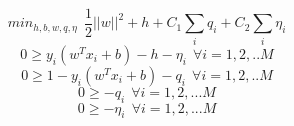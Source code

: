 \begin{equation}\label{mcmeq1}
min_{h,b,w,q,\eta}\:\: \frac{1}{2}||w||^2 + h + C_1\sum_i{q_i} + C_2\sum_i{\eta_i}
\end{equation}
\begin{equation}\label{mcmeq2}
0 \geq y_i(w^Tx_i+b) - h - \eta_i \:\:\forall i={1, 2, .. M}
\end{equation}
\begin{equation}\label{mcmeq3}
0 \geq 1 - y_i(w^Tx_i +b) - q_i \:\:\forall i={1,2,.. M}
\end{equation}
\begin{equation}\label{mcmeq4}
0 \geq -q_i \:\:\forall i={1, 2, ... M}
\end{equation}
\begin{equation}
0 \geq -\eta_i \:\:\forall i={1, 2, ... M}
\end{equation}

